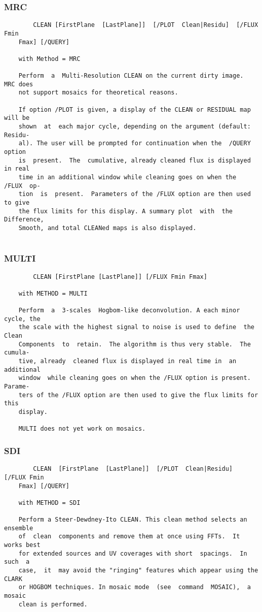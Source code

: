 \subsubsection{MRC}
\begin{verbatim}
        CLEAN [FirstPlane  [LastPlane]]  [/PLOT  Clean|Residu]  [/FLUX  Fmin
    Fmax] [/QUERY]

    with Method = MRC

    Perform  a  Multi-Resolution CLEAN on the current dirty image.  MRC does
    not support mosaics for theoretical reasons.

    If option /PLOT is given, a display of the CLEAN or RESIDUAL map will be
    shown  at  each major cycle, depending on the argument (default: Residu-
    al). The user will be prompted for continuation when the  /QUERY  option
    is  present.  The  cumulative, already cleaned flux is displayed in real
    time in an additional window while cleaning goes on when the  /FLUX  op-
    tion  is  present.  Parameters of the /FLUX option are then used to give
    the flux limits for this display. A summary plot  with  the  Difference,
    Smooth, and total CLEANed maps is also displayed.


\end{verbatim}
\subsubsection{MULTI}
\begin{verbatim}
        CLEAN [FirstPlane [LastPlane]] [/FLUX Fmin Fmax]

    with METHOD = MULTI

    Perform  a  3-scales  Hogbom-like deconvolution. A each minor cycle, the
    the scale with the highest signal to noise is used to define  the  Clean
    Components  to  retain.  The algorithm is thus very stable.  The cumula-
    tive, already  cleaned flux is displayed in real time in  an  additional
    window  while cleaning goes on when the /FLUX option is present. Parame-
    ters of the /FLUX option are then used to give the flux limits for  this
    display.

    MULTI does not yet work on mosaics.

\end{verbatim}
\subsubsection{SDI}
\begin{verbatim}
        CLEAN  [FirstPlane  [LastPlane]]  [/PLOT  Clean|Residu]  [/FLUX Fmin
    Fmax] [/QUERY]

    with METHOD = SDI

    Perform a Steer-Dewdney-Ito CLEAN. This clean method selects an ensemble
    of  clean  components and remove them at once using FFTs.  It works best
    for extended sources and UV coverages with short  spacings.  In  such  a
    case,  it  may avoid the "ringing" features which appear using the CLARK
    or HOGBOM techniques. In mosaic mode  (see  command  MOSAIC),  a  mosaic
    clean is performed.

\end{verbatim}
